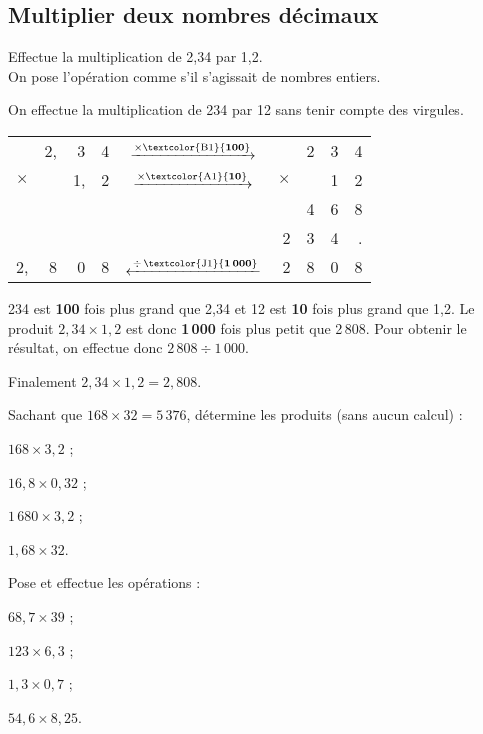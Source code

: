 	\subsection{Multiplier deux nombres décimaux}
\begin{methode*1}
\begin{exemple*1}

Effectue la multiplication de 2,34 par 1,2.\\[0.5em]

On pose l'opération comme s'il s'agissait de nombres entiers. 

On effectue la multiplication de 234 par 12 sans tenir compte des virgules.

\begin{minipage}{.6\linewidth}
\begin{tabular}{rrrrcrrrr}
& 2, & 3 & 4 & $\xrightarrow{\times \text{\textcolor{B1}{\textbf{100}}}}$ & & 2 & 3 & 4 \\
$\times$ & & 1, & 2 & $\xrightarrow{\times \text{\textcolor{A1}{\textbf{10}}}}$ & $\times$ & & 1 & 2 \\ \cline{1-4} \cline{6-9}
& & & & & & 4 & 6 & 8 \\
& & & & & 2 & 3 & 4 & . \\ \cline{1-4} \cline{6-9}
2, & 8 & 0 & 8 & $\xleftarrow{\,\div\,\text{\textcolor{J1}{\textbf{1\,000}}}}$ & 2 & 8 & 0 & 8 \\
\end{tabular}
\end{minipage}\hfill%
%
\begin{minipage}{.37\linewidth}
234 est \textcolor{B1}{\textbf{100}} fois plus grand que 2,34 et 12 est \textcolor{A1}{\textbf{10}} fois plus grand que 1,2. Le produit $2,34 \times 1,2$ est donc \textcolor{J1}{\textbf{1\,000}} fois plus petit que 2\,808. Pour obtenir le résultat, on effectue donc $2\,808 \div 1\,000$.\\[0.75em]
\end{minipage}
Finalement $2,34 \times 1,2 = 2,808$.
\end{exemple*1}

\exercice

Sachant que $168 \times 32 = 5\,376$, détermine les produits (sans aucun calcul) :
\begin{colenumerate}{4}
 \item $168 \times 3,2$ ;
 \item $16,8 \times 0,32$ ;
 \item $1\,680 \times 3,2$ ;
 \item $1,68 \times 32$.
\end{colenumerate}

Pose et effectue les opérations :
\begin{colenumerate}{4}
 \item $68,7 \times 39$ ;
 \item $123 \times 6,3$ ;
 \item $1,3 \times 0,7$ ;
 \item $54,6 \times 8,25$.
\end{colenumerate}
\end{methode*1}

